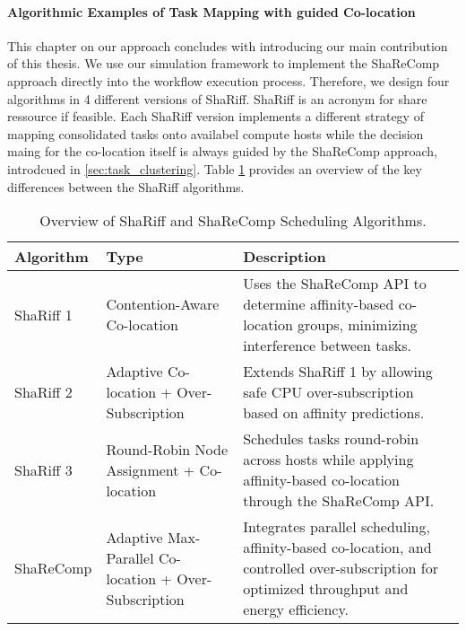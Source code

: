 \paragraph{Algorithmic Examples of Task Mapping with guided Co-location}
\label{sec:co-location_strategies}

This chapter on our approach concludes with introducing our main contribution of this thesis. We use our simulation framework to implement the ShaReComp approach directly into the workflow execution process. Therefore, we design four algorithms in 4 different versions of ShaRiff. ShaRiff is an acronym for share ressource if feasible. Each ShaRiff version implements a different strategy of mapping consolidated tasks onto availabel compute hosts while the decision maing for the co-location itself is always guided by the ShaReComp approach, introdcued in \ref{sec:task_clustering}.
Table \ref{tab:shariff_overview} provides an overview of the key differences between the ShaRiff algorithms.

\begin{table}[H]
    \centering
    \caption{Overview of ShaRiff and ShaReComp Scheduling Algorithms.}
    \label{tab:shariff_overview}
    \begin{tabularx}{\textwidth}{l l X}
        \toprule
        \textbf{Algorithm} & \textbf{Type}                                         & \textbf{Description}                                                                                                                         \\
        \midrule
        ShaRiff 1          & Contention-Aware Co-location                          & Uses the ShaReComp API to determine affinity-based co-location groups, minimizing interference between tasks.                                \\

        ShaRiff 2          & Adaptive Co-location + Over-Subscription              & Extends ShaRiff 1 by allowing safe CPU over-subscription based on affinity predictions.                                                      \\

        ShaRiff 3          & Round-Robin Node Assignment + Co-location             & Schedules tasks round-robin across hosts while applying affinity-based co-location through the ShaReComp API.                                \\

        ShaReComp          & Adaptive Max-Parallel Co-location + Over-Subscription & Integrates parallel scheduling, affinity-based co-location, and controlled over-subscription for optimized throughput and energy efficiency. \\
        \bottomrule
    \end{tabularx}
\end{table}

